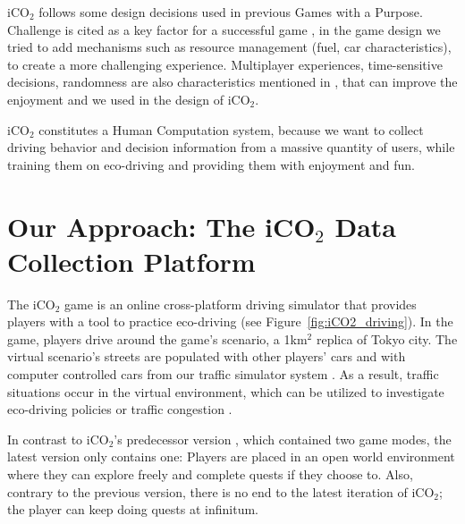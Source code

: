 \documentclass[preprint,authoryear,12pt]{elsarticle}
\begin{document}


iCO$_2$ follows some design decisions used in previous Games with a Purpose. Challenge is cited as a key factor for a successful game \cite{vonAhn.2008}, in the game design we tried to add mechanisms such as resource management (fuel, car characteristics), to create a more challenging experience. Multiplayer experiences, time-sensitive decisions, randomness are also characteristics mentioned in \cite{vonAhn.2008}, that can improve the enjoyment and we used in the design of iCO$_2$.




iCO$_2$ constitutes a Human Computation system, because we want to collect driving behavior and decision information from a massive quantity of users, while training them on eco-driving and providing them with enjoyment and fun.


\section{Our Approach: The iCO$_2$ Data Collection Platform}\label{sec:platform}

The iCO$_2$ game is an online cross-platform driving simulator that provides players with a tool to practice eco-driving (see Figure~\ref{fig:iCO2_driving}). In the game, players drive around the game's scenario, a 1km$^2$ replica of Tokyo city. The virtual scenario's streets are populated with other players' cars and with computer controlled cars from our traffic simulator system \citep{Prendinger+others.2014}. As a result, traffic situations occur in the virtual environment, which can be utilized to investigate eco-driving policies \citep{Prendinger+others.2013} or traffic congestion \citep{Gajananan+others.2013}.

In contrast to iCO$_2$'s predecessor version \citep{prendingeroliveira2014}, which contained two game modes, the latest version only contains one: Players are placed in an open world environment where they can explore freely and complete quests if they choose to. Also, contrary to the previous version, there is no end to the latest iteration of iCO$_2$; the player can keep doing quests at infinitum.
\end{document}
